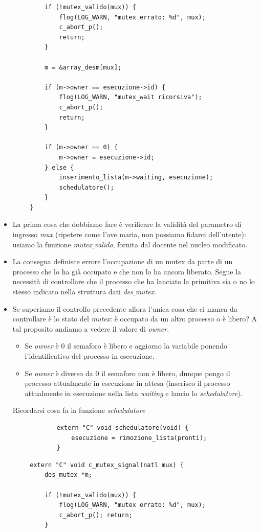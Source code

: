 \begin{itemize}
\begin{verbatim}
			if (!mutex_valido(mux)) {
				flog(LOG_WARN, "mutex errato: %d", mux);
				c_abort_p();
				return;
			}
			
			m = &array_desm[mux];
			
			if (m->owner == esecuzione->id) {
				flog(LOG_WARN, "mutex_wait ricorsiva");
				c_abort_p();
				return;
			}
			
			if (m->owner == 0) {
				m->owner = esecuzione->id;
			} else {
				inserimento_lista(m->waiting, esecuzione);
				schedulatore();
			}
		}
	\end{verbatim} 
	\begin{itemize}
		\item La prima cosa che dobbiamo fare è verificare la validità del parametro di ingresso \emph{mux} (ripetere come l'ave maria, non possiamo fidarci dell'utente): usiamo la funzione \emph{mutex$\_$valido}, fornita dal docente nel nucleo modificato.
		\item La consegna definisce errore l'occupazione di un mutex da parte di un processo che lo ha già occupato e che non lo ha ancora liberato. Segue la necessità di controllare che il processo che ha lanciato la primitiva sia o no lo stesso indicato nella struttura dati \emph{des$\_$mutex}. 
		\item Se superiamo il controllo precedente allora l'unica cosa che ci manca da controllare è lo stato del \emph{mutex}: è occupato da un altro processo o è libero? A tal proposito andiamo a vedere il valore di \emph{owner}.
		\begin{itemize}
			\item Se \emph{owner} è 0 il semaforo è libero e aggiorno la variabile ponendo l'identificativo del processo in esecuzione.
			\item Se \emph{owner} è diverso da 0 il semaforo non è libero, dunque pongo il processo attualmente in esecuzione in attesa (inserisco il processo attualmente in esecuzione nella lista \emph{waiting} e lancio lo \emph{schedulatore}).
		\end{itemize}
		Ricordarsi cosa fa la funzione \emph{schedulatore}
		\begin{verbatim}
			extern "C" void schedulatore(void) {
				esecuzione = rimozione_lista(pronti);	
			}
		\end{verbatim}
	\end{itemize}
	\begin{verbatim}
		extern "C" void c_mutex_signal(natl mux) {
			des_mutex *m;
			
			if (!mutex_valido(mux)) {
				flog(LOG_WARN, "mutex errato: %d", mux);
				c_abort_p(); return;
			}
			

\end{verbatim}
\end{itemize}
